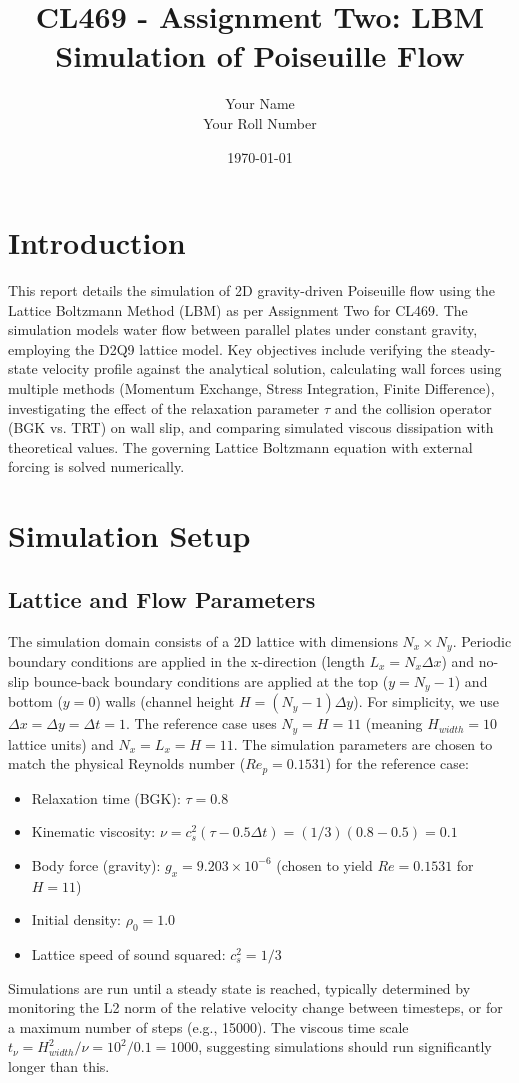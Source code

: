 \documentclass[11pt, a4paper]{article}
\title{CL469 - Assignment Two: LBM Simulation of Poiseuille Flow}
\author{Your Name \\ Your Roll Number}
\date{\today}
\begin{document}
\maketitle

\section{Introduction}
This report details the simulation of 2D gravity-driven Poiseuille flow using the Lattice Boltzmann Method (LBM) as per Assignment Two for CL469. The simulation models water flow between parallel plates under constant gravity, employing the D2Q9 lattice model. Key objectives include verifying the steady-state velocity profile against the analytical solution, calculating wall forces using multiple methods (Momentum Exchange, Stress Integration, Finite Difference), investigating the effect of the relaxation parameter $\tau$ and the collision operator (BGK vs. TRT) on wall slip, and comparing simulated viscous dissipation with theoretical values. The governing Lattice Boltzmann equation with external forcing is solved numerically.

\section{Simulation Setup}
\subsection{Lattice and Flow Parameters}
The simulation domain consists of a 2D lattice with dimensions $N_x \times N_y$. Periodic boundary conditions are applied in the x-direction (length $L_x = N_x \Delta x$) and no-slip bounce-back boundary conditions are applied at the top ($y=N_y-1$) and bottom ($y=0$) walls (channel height $H = (N_y-1) \Delta y$). For simplicity, we use $\Delta x = \Delta y = \Delta t = 1$. The reference case uses $N_y = H = 11$ (meaning $H_{width}=10$ lattice units) and $N_x = L_x = H = 11$. The simulation parameters are chosen to match the physical Reynolds number ($Re_p = 0.1531$) for the reference case:
\begin{itemize}
    \item Relaxation time (BGK): $\tau = 0.8$
    \item Kinematic viscosity: $\nu = c_s^2 (\tau - 0.5 \Delta t) = (1/3)(0.8 - 0.5) = 0.1$
    \item Body force (gravity): $g_x = 9.203 \times 10^{-6}$ (chosen to yield $Re=0.1531$ for $H=11$)
    \item Initial density: $\rho_0 = 1.0$
    \item Lattice speed of sound squared: $c_s^2 = 1/3$
\end{itemize}
Simulations are run until a steady state is reached, typically determined by monitoring the L2 norm of the relative velocity change between timesteps, or for a maximum number of steps (e.g., 15000). The viscous time scale $t_{\nu} = H_{width}^2 / \nu = 10^2 / 0.1 = 1000$, suggesting simulations should run significantly longer than this.
\end{document}
